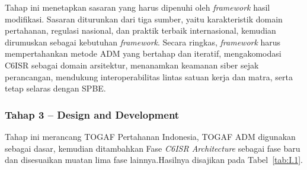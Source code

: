 Tahap ini menetapkan sasaran yang harus dipenuhi oleh \textit{framework} hasil modifikasi. Sasaran diturunkan dari tiga sumber, yaitu karakteristik domain pertahanan, regulasi nasional, dan praktik terbaik internasional, kemudian dirumuskan sebagai kebutuhan \textit{framework}. Secara ringkas, \textit{framework} harus mempertahankan metode ADM yang bertahap dan iteratif, mengakomodasi C6ISR sebagai domain arsitektur, menanamkan keamanan siber sejak perancangan, mendukung interoperabilitas lintas satuan kerja dan matra, serta tetap selaras dengan SPBE.
\begin{landscape}

\subsubsection{Tahap 3 – Design and Development}
\label{sec:I.7.2.3}

Tahap ini merancang TOGAF Pertahanan Indonesia, TOGAF ADM digunakan sebagai dasar, kemudian ditambahkan Fase \textit{C6ISR Architecture} sebagai fase baru dan disesuaikan muatan lima fase lainnya.Hasilnya disajikan pada Tabel~\ref{tab:I.1}.


\end{landscape}
